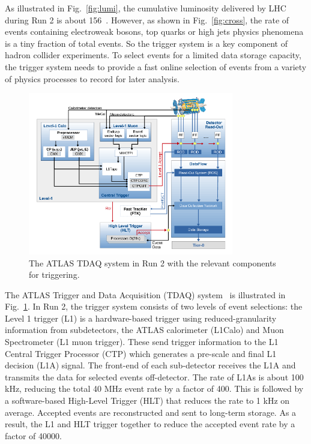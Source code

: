 \par As illustrated in Fig.~\ref{fig:lumi}, the cumulative luminosity delivered by LHC during Run 2 is about 156~\ifb. However, as shown in Fig.~\ref{fig:cross}, the rate of events containing electroweak bosons, top quarks or high \pt jets physics phenomena is a tiny fraction of total events. So the trigger system is a key component of hadron collider experiments. To select events for a limited data storage capacity, the trigger system needs to provide a fast online selection of events from a variety of physics processes to record for later analysis.

\begin{figure}[htbp!]
    \centering
    \includegraphics[width=0.8\textwidth]{chapters/c4/figures/TDAQ}
    \caption{The ATLAS TDAQ system in Run 2 with the relevant components for triggering.}
    \label{fig:TDAQ}
\end{figure}

\par The ATLAS Trigger and Data Acquisition (TDAQ) system~\cite{Ruiz-Martinez:2133909} is illustrated in Fig.~\ref{fig:TDAQ}. In Run 2, the trigger system consists of two levels of event selections: the Level 1 trigger (L1) is a hardware-based trigger using reduced-granularity information from subdetectors, the ATLAS calorimeter (L1Calo) and Muon Spectrometer (L1 muon trigger). These send trigger information to the L1 Central Trigger Processor (CTP) which generates a pre-scale and final L1 decision (L1A) signal. The front-end of each sub-detector receives the L1A and transmits the data for selected events off-detector. The rate of L1As is about 100 kHz, reducing the total 40 MHz event rate by a factor of 400. This is followed by a software-based High-Level Trigger (HLT) that reduces the rate to 1 kHz on average. Accepted events are reconstructed and sent to long-term storage. As a result, the L1 and HLT trigger together to reduce the accepted event rate by a factor of 40000.
